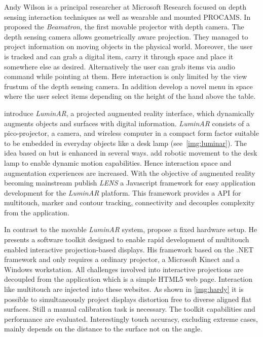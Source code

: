Andy Wilson is a principal researcher at Microsoft Research focused on depth sensing interaction techniques \cite{Wilson:2010de,Wilson:2010bv} as well as wearable \cite{Harrison:2011bn} and mounted PROCAMS. In \citeyear{Wilson:2012fb} \citeauthor{Wilson:2012fb} proposed the \textit{Beamatron}, the first movable projector with depth camera. The depth sensing camera allows geometrically aware projection. They managed to project information on moving objects in the physical world. Moreover, the user is tracked and can grab a digital item, carry it through space and place it somewhere else as desired. Alternatively the user can grab items via audio command while pointing at them. Here interaction is only limited by the view frustum of the depth sensing camera. In addition \citeauthor{Wilson:2012fb} develop a novel menu in space where the user select items depending on the height of the hand above the table.

\textcite{Linder:2010cu} introduce \textit{LuminAR}, a projected augmented reality interface, which dynamically augments objects and surfaces with digital information. \textit{LuminAR} consists of a pico-projector,  a camera, and wireless computer in a compact form factor suitable to be embedded in everyday objects like a desk lamp (see~\autoref{img:luminar}). The idea based on \cite{Underkoffler:1999iv} but is enhanced in several ways. \citeauthor{Linder:2010cu} add robotic movement to the desk lamp to  enable dynamic motion capabilities. Hence interaction space and augmentation experiences are increased. 
With the objective of augmented reality becoming mainstream \textcite{Weissmann:2013uj} publish \textit{LENS} a Javascript framework for easy application development for the \textit{LuminAR} platform. This framework provides a API for multitouch, marker and contour tracking, connectivity and decouples complexity from the application. 



In contrast to the movable \textit{LuminAR} system, \textcite{Hardy:2012jo} propose a fixed hardware setup. He presents a software toolkit designed to enable rapid development of multitouch enabled interactive projection-based displays. His framework based on the .NET framework and only requires a ordinary projector, a Microsoft Kinect and a Windows workstation. All challenges involved into interactive projections are decoupled from the application which is a simple HTML5 web page. Interaction like multitouch are injected into these websites. As shown in \autoref{img:hardy} it is possible to simultaneously project displays distortion free to diverse aligned flat surfaces. Still a manual calibration task is necessary. The toolkit capabilities and performance are evaluated. Interestingly touch accuracy, excluding extreme cases, mainly depends on the distance to the surface not on the angle.  

